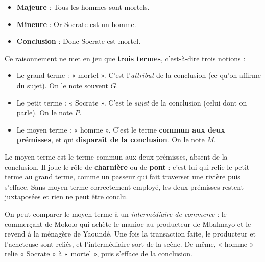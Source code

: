 \documentclass[11pt]{article}
\newcommand{\cle}[1]{{\popxbold\color{popdark}#1}}
\begin{document}
\begin{exemplebox}
\begin{itemize}
\item \textbf{Majeure} : Tous les hommes sont mortels.
\item \textbf{Mineure} : Or Socrate est un homme.
\item \textbf{Conclusion} : Donc Socrate est mortel.
\end{itemize}
\end{exemplebox}

Ce raisonnement ne met en jeu que \textbf{trois termes}, c'est-à-dire trois notions :

\begin{itemize}
\item Le \cle{grand terme} : « mortel ». C'est l'\emph{attribut} de la conclusion (ce qu'on affirme du sujet). On le note souvent $G$.
\item Le \cle{petit terme} : « Socrate ». C'est le \emph{sujet} de la conclusion (celui dont on parle). On le note $P$.
\item Le \cle{moyen terme} : « homme ». C'est le terme \textbf{commun aux deux prémisses}, et qui \textbf{disparaît de la conclusion}. On le note $M$.
\end{itemize}

\begin{definition}
Le \cle{moyen terme} est le terme commun aux deux prémisses, absent de la conclusion. Il joue le rôle de \textbf{charnière} ou de \textbf{pont} : c'est lui qui relie le petit terme au grand terme, comme un passeur qui fait traverser une rivière puis s'efface. Sans moyen terme correctement employé, les deux prémisses restent juxtaposées et rien ne peut être conclu.
\end{definition}

On peut comparer le moyen terme à un \emph{intermédiaire de commerce} : le commerçant de Mokolo qui achète le manioc au producteur de Mbalmayo et le revend à la ménagère de Yaoundé. Une fois la transaction faite, le producteur et l'acheteuse sont reliés, et l'intermédiaire sort de la scène. De même, « homme » relie « Socrate » à « mortel », puis s'efface de la conclusion.
\end{document}
